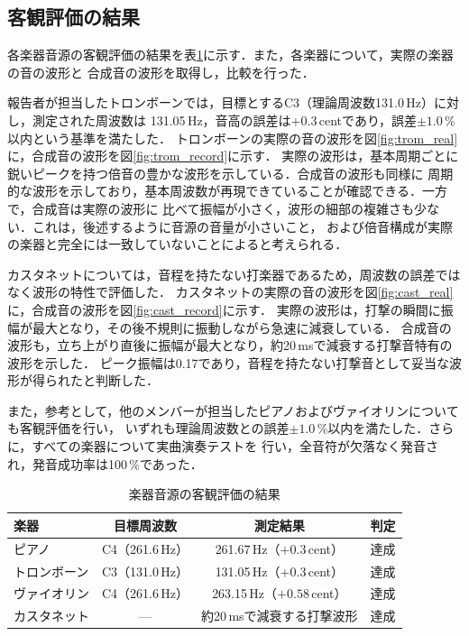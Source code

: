 \subsection{客観評価の結果}
各楽器音源の客観評価の結果を表\ref{tab:objective}に示す．また，各楽器について，実際の楽器の音の波形と
合成音の波形を取得し，比較を行った．

報告者が担当したトロンボーンでは，目標とするC3（理論周波数131.0\,Hz）に対し，測定された周波数は
131.05\,Hz，音高の誤差は$+0.3$\,centであり，誤差$\pm1.0$\,\%以内という基準を満たした．
トロンボーンの実際の音の波形を図\ref{fig:trom_real}に，合成音の波形を図\ref{fig:trom_record}に示す．
実際の波形は，基本周期ごとに鋭いピークを持つ倍音の豊かな波形を示している．合成音の波形も同様に
周期的な波形を示しており，基本周波数が再現できていることが確認できる．一方で，合成音は実際の波形に
比べて振幅が小さく，波形の細部の複雑さも少ない．これは，後述するように音源の音量が小さいこと，
および倍音構成が実際の楽器と完全には一致していないことによると考えられる．

カスタネットについては，音程を持たない打楽器であるため，周波数の誤差ではなく波形の特性で評価した．
カスタネットの実際の音の波形を図\ref{fig:cast_real}に，合成音の波形を図\ref{fig:cast_record}に示す．
実際の波形は，打撃の瞬間に振幅が最大となり，その後不規則に振動しながら急速に減衰している．
合成音の波形も，立ち上がり直後に振幅が最大となり，約20\,msで減衰する打撃音特有の波形を示した．
ピーク振幅は0.17であり，音程を持たない打撃音として妥当な波形が得られたと判断した．

また，参考として，他のメンバーが担当したピアノおよびヴァイオリンについても客観評価を行い，
いずれも理論周波数との誤差$\pm1.0$\,\%以内を満たした．さらに，すべての楽器について実曲演奏テストを
行い，全音符が欠落なく発音され，発音成功率は100\,\%であった．

\begin{table}[H]
  \centering
  \caption{楽器音源の客観評価の結果}
  \label{tab:objective}
  \begin{tabular}{lccc}
    \hline
    楽器 & 目標周波数 & 測定結果 & 判定 \\
    \hline
    ピアノ & C4（261.6\,Hz） & 261.67\,Hz（$+0.3$\,cent） & 達成 \\
    トロンボーン & C3（131.0\,Hz） & 131.05\,Hz（$+0.3$\,cent） & 達成 \\
    ヴァイオリン & C4（261.6\,Hz） & 263.15\,Hz（$+0.58$\,cent） & 達成 \\
    カスタネット & --- & 約20\,msで減衰する打撃波形 & 達成 \\
    \hline
  \end{tabular}
\end{table}


